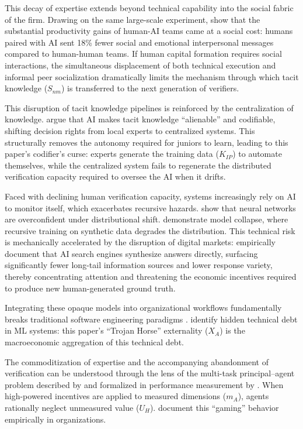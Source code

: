 \documentclass[12pt, letter]{article}
\begin{document}
This decay of expertise extends beyond technical capability into the social fabric of the firm. Drawing on the same large-scale experiment, \citet{JuAral2025} show that the substantial productivity gains of human-AI teams came at a social cost: humans paired with AI sent 18\% fewer social and emotional interpersonal messages compared to human-human teams. If human capital formation requires social interactions, the simultaneous displacement of both technical execution and informal peer socialization dramatically limits the mechanism through which tacit knowledge ($S_{nm}$) is transferred to the next generation of verifiers.

This disruption of tacit knowledge pipelines is reinforced by the centralization of knowledge. \citet{BrynjolfssonHitzig2025} argue that AI makes tacit knowledge ``alienable'' and codifiable, shifting decision rights from local experts to centralized systems. This structurally removes the autonomy required for juniors to learn, leading to this paper's codifier's curse: experts generate the training data ($K_{IP}$) to automate themselves, while the centralized system fails to regenerate the distributed verification capacity required to oversee the AI when it drifts.

Faced with declining human verification capacity, systems increasingly rely on AI to monitor itself, which exacerbates recursive hazards. \citet{Ovadia2019} show that neural networks are overconfident under distributional shift. \citet{Shumailov2024} demonstrate model collapse, where recursive training on synthetic data degrades the distribution. This technical risk is mechanically accelerated by the disruption of digital markets: \citet{AralLiZuo2026} empirically document that AI search engines synthesize answers directly, surfacing significantly fewer long-tail information sources and lower response variety, thereby concentrating attention and threatening the economic incentives required to produce new human-generated ground truth.

Integrating these opaque models into organizational workflows fundamentally breaks traditional software engineering paradigms \citep{Amershi2019}. \citet{Sculley2015} identify hidden technical debt in ML systems: this paper's ``Trojan Horse'' externality ($X_A$) is the macroeconomic aggregation of this technical debt.

The commoditization of expertise and the accompanying abandonment of verification can be understood through the lens of the multi-task principal--agent problem described by \citet{HolmstromMilgrom1991} and formalized in performance measurement by \citet{Baker1992}. When high-powered incentives are applied to measured dimensions ($m_A$), agents rationally neglect unmeasured value ($U_H$). \citet{CourtyMarschke2004} document this ``gaming'' behavior empirically in organizations. 
\end{document}
